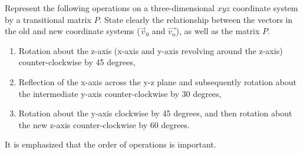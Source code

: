\begin{Exercise}
Represent the following operations on a three-dimensional $xyz$ coordinate system by a transitional matrix $P$. State clearly the relationship between the vectors in the old and new coordinate systems ($\vec{v}_0$ and $\vec{v_n}$), as well as the matrix $P$.
\begin{enumerate}[label=(\alph*)]
\item Rotation about the z-axis (x-axis and y-axis revolving around the z-axis) counter-clockwise by 45 degrees,
\item Reflection of the x-axis across the y-z plane and subsequently rotation about the intermediate y-axis counter-clockwise by 30 degrees,
\item Rotation about the y-axis clockwise by 45 degrees, and then rotation about the new z-axis counter-clockwise by 60 degrees.
\end{enumerate}
It is emphasized that the order of operations is important.
\end{Exercise}
